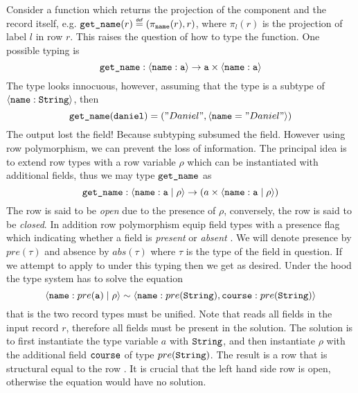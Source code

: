 Consider a function which returns the projection of the  component and the record itself, e.g. $\code{get\_name}(r) \defas (\pi_{\code{name}}(r), r)$, where $\pi_l(r)$ is the projection of label $l$ in row $r$. This raises the question of how to type the function. One possible typing is 
\[ \texttt{get\_name} : \langle \texttt{name}:\texttt{a} \rangle \to \texttt{a} \times \langle \texttt{name}:\texttt{a} \rangle \]
The type looks innocuous, however, assuming that the type  is a subtype of $\langle \texttt{name}:\texttt{String} \rangle$, then 
\[
  \texttt{get\_name}(\texttt{daniel}) = ("Daniel", \langle \texttt{name}="Daniel" \rangle)
\]
The output lost the  field! Because subtyping subsumed the field. However using row polymorphism, we can prevent the loss of information.
The principal idea is to extend row types with a row variable $\rho$ which can be instantiated with additional fields, thus we may type $\texttt{get\_name}$ as
\[ \texttt{get\_name} : \langle \texttt{name}:\texttt{a} \; | \; \rho \rangle \to (a \times \langle \texttt{name}:\texttt{a} \; | \; \rho \rangle) \]
The row  is said to be \emph{open} due to the presence of $\rho$, conversely, the row  is said to be \emph{closed}. In addition row polymorphism equip field types with a presence flag which indicating whether a field is \emph{present} or \emph{absent} \cite{Remy1993}. We will denote presence by $pre(\tau)$ and absence by $abs(\tau)$ where $\tau$ is the type of the field in question. If we attempt to apply  to  under this typing then we get  as desired. Under the hood the type system has to solve the equation 
\[ 
\langle \texttt{name}:pre(\texttt{a}) \; | \; \rho \rangle \sim \langle \texttt{name}:pre(\texttt{String}),\texttt{course}:pre(\texttt{String}) \rangle
\]
that is the two record types must be unified. Note that  reads all fields in the input record $r$, therefore all fields must be present in the solution. The solution is to first instantiate the type variable $a$ with $\texttt{String}$, and then instantiate $\rho$ with the additional field $\texttt{course}$ of type $pre(\texttt{String})$. The result is a row that is structural equal to the row . It is crucial that the left hand side row is open, otherwise the equation would have no solution.

